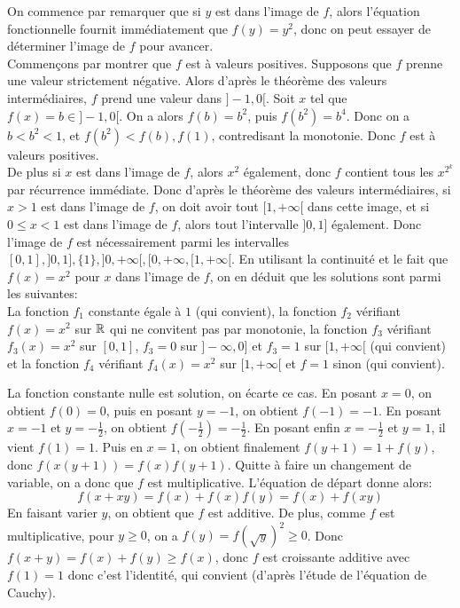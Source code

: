 \begin{sol}
On commence par remarquer que si $y$ est dans l'image de $f$, alors l'équation fonctionnelle fournit immédiatement que $f(y)=y^2$, donc on peut essayer de déterminer l'image de $f$ pour avancer. \\
Commençons par montrer que $f$ est à valeurs positives. Supposons que $f$ prenne une valeur strictement négative. Alors d'après le théorème des valeurs intermédiaires, $f$ prend une valeur dans $]-1,0[$. Soit $x$ tel que $f(x)=b\in ]-1,0[$. On a alors $f(b)=b^2$, puis $f(b^2)=b^4$. Donc on a $b<b^2<1$, et $f(b^2)<f(b),f(1)$, contredisant la monotonie. Donc $f$ est à valeurs positives. \\
De plus si $x$ est dans l'image de $f$, alors $x^2$ également, donc $f$ contient tous les $x^{2^k}$ par récurrence immédiate. Donc d'après le théorème des valeurs intermédiaires, si $x>1$ est dans l'image de $f$, on doit avoir tout $[1,+\infty[$ dans cette image, et si $0\le x<1$ est dans l'image de $f$, alors tout l'intervalle $]0,1]$ également. Donc l'image de $f$ est nécessairement parmi les intervalles $[0,1],]0,1],\{1\},]0,+\infty[,[0,+\infty, [1,+\infty[$. En utilisant la continuité et le fait que $f(x)=x^2$ pour $x$ dans l'image de $f$, on en déduit que les solutions sont parmi les suivantes:\\
La fonction $f_1$ constante égale à $1$ (qui convient), la fonction $f_2$ vérifiant $f(x)=x^2$ sur $\mathbb R$ qui ne convitent pas par monotonie, la fonction $f_3$ vérifiant $f_3(x)=x^2$ sur $[0,1]$, $f_3=0$ sur $]-\infty,0]$ et $f_3=1$ sur $[1,+\infty[$ (qui convient) et la fonction $f_4$ vérifiant $f_4(x)=x^2$ sur $[1,+\infty[$ et $f=1$ sinon (qui convient).
\end{sol}


\begin{sol}
La fonction constante nulle est solution, on écarte ce cas. En posant $x=0$, on obtient $f(0)=0$, puis en posant $y=-1$, on obtient $f(-1)=-1$. En posant $x=-1$ et $y=-\displaystyle\frac{1}{2}$, on obtient $f\left(-\displaystyle\frac{1}{2}\right)=-\displaystyle\frac{1}{2}$. En posant enfin $x=-\displaystyle\frac{1}{2}$ et $y=1$, il vient $f(1)=1$. Puis en $x=1$, on obtient finalement $f(y+1)=1+f(y)$, donc $f(x(y+1))=f(x)f(y+1)$. Quitte à faire un changement de variable, on a donc que $f$ est multiplicative. L'équation de départ donne alors:
$$f(x+xy)=f(x)+f(x)f(y)=f(x)+f(xy)$$
En faisant varier $y$, on obtient que $f$ est additive. De plus, comme $f$ est multiplicative, pour $y\ge 0$, on a $f(y)=f(\sqrt{y})^2\ge 0$. Donc $f(x+y)=f(x)+f(y)\ge f(x)$, donc $f$ est croissante additive avec $f(1)=1$ donc c'est l'identité, qui convient (d'après l'étude de l'équation de Cauchy).
\end{sol}


